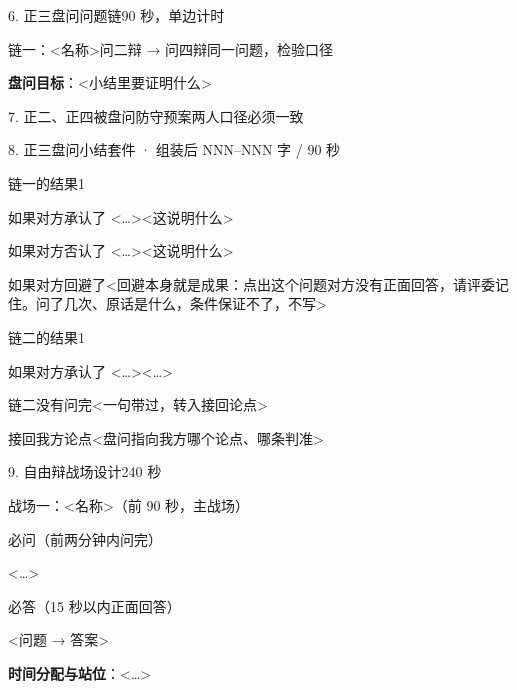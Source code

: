\begin{stage}{6. 正三盘问问题链}{90 秒，单边计时}
\begin{chain}{链一：<名称>}{问二辩 → 问四辩同一问题，检验口径}
\end{chain}
\textbf{盘问目标}：<小结里要证明什么>
\end{stage}

\begin{stage}{7. 正二、正四被盘问防守预案}{两人口径必须一致}
\begin{qaa}
\end{qaa}
\end{stage}

\begin{kit}{8. 正三盘问小结}{套件 · 组装后 NNN–NNN 字 / 90 秒}
\begin{pick}{链一的结果}{1}
\begin{module}{如果对方承认了 <…>}<这说明什么>\end{module}
\begin{module}{如果对方否认了 <…>}<这说明什么>\end{module}
\begin{module}{如果对方回避了}<回避本身就是成果：点出这个问题对方没有正面回答，请评委记住。问了几次、原话是什么，条件保证不了，不写>\end{module}
\end{pick}
\begin{pick}{链二的结果}{1}
\begin{module}{如果对方承认了 <…>}<…>\end{module}
\begin{fallback}{链二没有问完}<一句带过，转入接回论点>\end{fallback}
\end{pick}
\begin{fixed}{接回我方论点}<盘问指向我方哪个论点、哪条判准>\end{fixed}
\end{kit}

\begin{stage}{9. 自由辩战场设计}{240 秒}
\begin{battleground}{战场一：<名称>（前 90 秒，主战场）}
\begin{fields}
\end{fields}
\end{battleground}
\begin{points}{必问（前两分钟内问完）}
\item <…>
\end{points}
\begin{points}{必答（15 秒以内正面回答）}
\item <问题 → 答案>
\end{points}
\textbf{时间分配与站位}：<…>
\end{stage}

